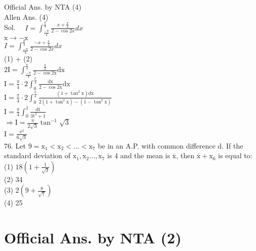 \documentclass[10pt]{article}
\begin{document}
Official Ans. by NTA (4)\\
Allen Ans. (4)\\
Sol. \(\quad I=\int_{\frac{-\pi}{4}}^{\frac{\pi}{4}} \frac{x+\frac{\pi}{4}}{2-\cos 2 x} d x\)\\
\(\mathrm{x} \rightarrow-\mathrm{x}\)\\
\(I=\int_{\frac{-\pi}{4}}^{\frac{\pi}{4}} \frac{-x+\frac{\pi}{4}}{2-\cos 2 x} d x\)\\
(1) + (2)\\
\(2 \mathrm{I}=\int_{\frac{-\pi}{4}}^{\frac{\pi}{4}} \frac{\frac{\pi}{2}}{2-\cos 2 \mathrm{x}} \mathrm{dx}\)\\
\(\mathrm{I}=\frac{\pi}{4} \cdot 2 \int_{0}^{\frac{\pi}{4}} \frac{\mathrm{dx}}{2-\cos 2 \mathrm{x}} \mathrm{dx}\)\\
\(\mathrm{I}=\frac{\pi}{4} \cdot 2 \int_{0}^{\frac{\pi}{4}} \frac{\left(1+\tan ^{2} \mathrm{x}\right) \mathrm{dx}}{2\left(1+\tan ^{2} \mathrm{x}\right)-\left(1-\tan ^{2} \mathrm{x}\right)}\)\\
\(\mathrm{I}=\frac{\pi}{4} \int_{0}^{1} \frac{\mathrm{dt}}{3 \mathrm{t}^{2}+1}\)\\
\(\Rightarrow \mathrm{I}=\frac{\pi}{2 \sqrt{3}} \tan ^{-1} \sqrt{3}\)\\
\(\mathrm{I}=\frac{\pi^{2}}{6 \sqrt{3}}\)\\
76. Let \(9=\mathrm{x}_{1}<\mathrm{x}_{2}<\ldots<\mathrm{x}_{7}\) be in an A.P. with common difference d. If the standard deviation of \(\mathrm{x}_{1}, \mathrm{x}_{2} \ldots, \mathrm{x}_{7}\) is 4 and the mean is \(\overline{\mathrm{x}}\), then \(\overline{\mathrm{x}}+\mathrm{x}_{6}\) is equal to:\\
(1) \(18\left(1+\frac{1}{\sqrt{3}}\right)\)\\
(2) 34\\
(3) \(2\left(9+\frac{8}{\sqrt{7}}\right)\)\\
(4) 25

\section*{Official Ans. by NTA (2)}
\end{document}
